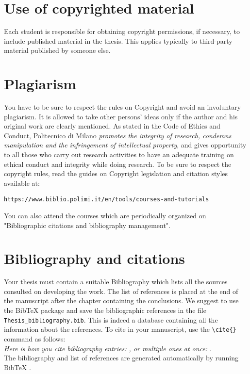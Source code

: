 \documentclass{Configuration_Files/PoliMi3i_thesis}
\begin{document}
\section{Use of copyrighted material}

Each student is responsible for obtaining copyright permissions, if necessary, to include published material in the thesis.
This applies typically to third-party material published by someone else.

\section{Plagiarism}

You have to be sure to respect the rules on Copyright and avoid an involuntary plagiarism.
It is allowed to take other persons' ideas only if the author and his original work are clearly mentioned.
As stated in the Code of Ethics and Conduct, Politecnico di Milano \textit{promotes the integrity of research,
	condemns manipulation and the infringement of intellectual property}, and gives opportunity to all those
who carry out research activities to have an adequate training on ethical conduct and integrity while doing research.
To be sure to respect the copyright rules, read the guides on Copyright legislation and citation styles available
at:
\begin{verbatim}
https://www.biblio.polimi.it/en/tools/courses-and-tutorials
\end{verbatim}
You can also attend the courses which are periodically organized on "Bibliographic citations and bibliography management".

\section{Bibliography and citations}
Your thesis must contain a suitable Bibliography which lists all the sources consulted on developing the work.
The list of references is placed at the end of the manuscript after the chapter containing the conclusions.
We suggest to use the BibTeX package and save the bibliographic references  in the file \verb|Thesis_bibliography.bib|.
This is indeed a database containing all the information about the references. To cite in your manuscript, use the \verb|\cite{}| command as follows:
\\
\textit{Here is how you cite bibliography entries: \cite{knuth74}, or multiple ones at once: \cite{knuth92,lamport94}}.
\\
The bibliography and list of references are generated automatically by running BibTeX \cite{bibtex}.
\end{document}
